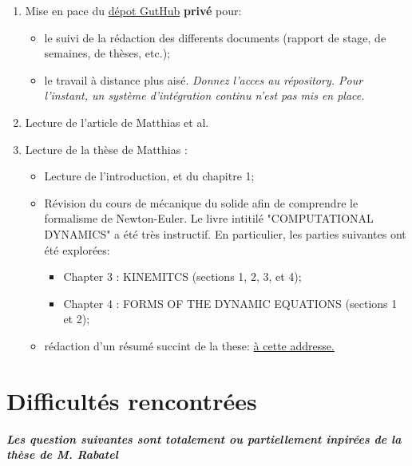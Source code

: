 \documentclass[
  french,
	11pt, %
]{fphw}
\begin{document}
\begin{enumerate}
  \item Mise en pace du \href{https://github.com/desmond-rn/ice-floes}{dépot GutHub} \textbf{privé} pour: 
  \begin{itemize}
    \item le suivi de la rédaction des differents documents (rapport de stage, de semaines, de thèses, etc.);
    \item le travail à distance plus aisé.
  \textit{Donnez l'acces au répository. Pour l'instant, un système d'intégration continu n'est pas mis en place.} 
  \end{itemize}
  \item Lecture de l'article de Matthias et al. \parencite{rabatel2015dynamics}
  \item Lecture de la thèse de Matthias \parencite{rabatel2015thesis}:
  \begin{itemize}
    \item Lecture de l'introduction, et du chapitre 1;
    \item Révision du cours de mécanique du solide afin de comprendre le formalisme de Newton-Euler. Le livre intitilé "COMPUTATIONAL DYNAMICS" \parencite{shabana2009computational} a été très instructif. En particulier, les parties suivantes ont été explorées:
    \begin{itemize}
      \item Chapter 3 : KINEMITCS (sections 1, 2, 3, et 4);
      \item Chapter 4 : FORMS OF THE DYNAMIC EQUATIONS (sections 1 et 2);
    \end{itemize}
    \item rédaction d'un résumé succint de la these: \href{https://github.com/desmond-rn/ice-floes/blob/master/reports/matthias/main.pdf}{à cette addresse.} 
  \end{itemize}
\end{enumerate}


\section{Difficultés rencontrées}

\textbf{\textit{Les question suivantes sont totalement ou partiellement inpirées de la thèse de M. Rabatel}}
\end{document}
